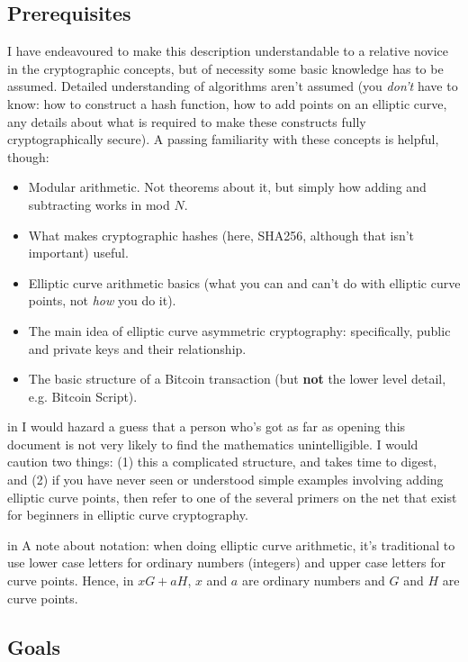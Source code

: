 \documentclass[10pt,a4paper]{article}
\begin{document}
\subsection{Prerequisites}

I have endeavoured to make this description understandable to a relative novice in the cryptographic concepts, but of necessity some basic knowledge has to be assumed. Detailed understanding of algorithms aren't assumed (you \textit{don't} have to know: how to construct a hash function, how to add points on an elliptic curve, any details about what is required to make these constructs fully cryptographically secure). A passing familiarity with these concepts is helpful, though:

\begin{itemize}
\item Modular arithmetic. Not theorems about it, but simply how adding and subtracting works in mod $N$.
\item What makes cryptographic hashes (here, SHA256, although that isn't important) useful.
\item Elliptic curve arithmetic basics (what you can and can't do with elliptic curve points, not \textit{how} you do it).
\item The main idea of elliptic curve asymmetric cryptography: specifically, public and private keys and their relationship.
\item The basic structure of a Bitcoin transaction (but \textbf{not} the lower level detail, e.g. Bitcoin Script).
\end{itemize}

 in \noindent I would hazard a guess that a person who's got as far as opening this document is not very likely to find the mathematics unintelligible. I would caution two things: (1) this a complicated structure, and takes time to digest, and (2) if you have never seen or understood simple examples involving adding elliptic curve points, then refer to one of the several primers on the net that exist for beginners in elliptic curve cryptography.

 in \noindent A note about notation: when doing elliptic curve arithmetic, it's traditional to use lower case letters for ordinary numbers (integers) and upper case letters for curve points. Hence, in $xG + aH$, $x$ and $a$ are ordinary numbers and $G$ and $H$ are curve points.

\subsection{Goals}
\end{document}
